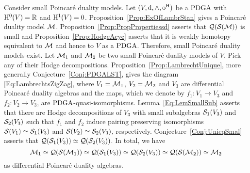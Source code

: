\documentclass[\MainFolder/Text.tex]{subfiles}
\begin{document}
%
%
%
%
%
%
%
%
%

Consider small Poincar\'e duality models. Let $(V,\mathrm{d},\wedge,\mathrm{o}^{\mathrm{H}})$ be a $\mathrm{PDGA}$ with $\mathrm{H}^0(V) = \mathbb{R}$ and $\mathrm{H}^1(V)=0$. Proposition~\ref{Prop:ExOfLambrStan} gives a Poincar\'e duality model $\mathcal{M}$. Proposition~\ref{Prop:PropPropertiessd} asserts that $\mathcal{Q}(\mathcal{S}(\mathcal{M}))$ is small and Proposition~\ref{Prop:HodgeAcyc} asserts that it is weakly homotopy equivalent to $\mathcal{M}$ and hence to $V$ as a $\mathrm{PDGA}$. Therefore, small Poincar\'e duality models exist. Let $\mathcal{M}_1$ and $\mathcal{M}_2$ be two small Poincar\'e duality models of $V$. Pick any of their Hodge decompositions. Proposition~\ref{Prop:LambrechtUnique}, more generally Conjecture~\ref{Conj:PDGALST}, gives the diagram \eqref{Eq:LambrechtsZigZag}, where $V_1 = \mathcal{M}_1$, $V_2 = \mathcal{M}_2$ and $V_3$ are differential Poincar\'e duality algebras and the maps, which we denote by $f_1: V_1 \rightarrow V_3$ and $f_2: V_2\rightarrow V_3$, are $\mathrm{PDGA}$-quasi-isomorphisms. Lemma~\ref{Eq:LemSmallSub} asserts that there are Hodge decompositions of $V_3$ with small subalgebras $\mathcal{S}_1(V_3)$ and $\mathcal{S}_2(V_3)$ such that $f_1$ and $f_2$ induce pairing preserving isomorphisms $\mathcal{S}(V_1) \simeq \mathcal{S}_1(V_3)$ and $\mathcal{S}(V_2) \simeq \mathcal{S}_2(V_3)$, respectively. Conjecture~\ref{Conj:UnieqSmal} asserts that $\mathcal{Q}(\mathcal{S}_1(V_3)) \simeq \mathcal{Q}(\mathcal{S}_2(V_3))$. In total, we have
$$ \mathcal{M}_1 \simeq \mathcal{Q}(\mathcal{S}(\mathcal{M}_1)) \simeq \mathcal{Q}(\mathcal{S}_1(V_3))\simeq \mathcal{Q}(\mathcal{S}_2(V_3)) \simeq \mathcal{Q}(\mathcal{S}(\mathcal{M}_2)) \simeq \mathcal{M}_2 $$
as differential Poincar\'e duality algebras.
\end{document}
